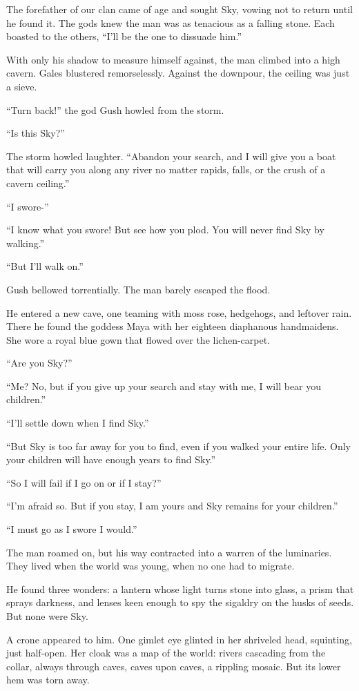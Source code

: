 The forefather of our clan came of age and sought Sky, vowing not to
return until he found it. The gods knew the man was as tenacious as a
falling stone. Each boasted to the others, ``I'll be the one to dissuade
him.''

With only his shadow to measure himself against, the man climbed into a
high cavern. Gales blustered remorselessly. Against the downpour, the
ceiling was just a sieve.

``Turn back!'' the god Gush howled from the storm.

``Is this Sky?''

The storm howled laughter. ``Abandon your search, and I will give you a
boat that will carry you along any river no matter rapids, falls, or the
crush of a cavern ceiling.''

``I swore-''

``I know what you swore! But see how you plod. You will never find Sky
by walking.''

``But I'll walk on.''

Gush bellowed torrentially. The man barely escaped the flood.

He entered a new cave, one teaming with moss rose, hedgehogs, and
leftover rain. There he found the goddess Maya with her eighteen
diaphanous handmaidens. She wore a royal blue gown that flowed over the
lichen-carpet.

``Are you Sky?''

``Me? No, but if you give up your search and stay with me, I will bear
you children.''

``I'll settle down when I find Sky.''

``But Sky is too far away for you to find, even if you walked your
entire life. Only your children will have enough years to find Sky.''

``So I will fail if I go on or if I stay?''

``I'm afraid so. But if you stay, I am yours and Sky remains for your
children.''

``I must go as I swore I would.''

The man roamed on, but his way contracted into a warren of the
luminaries. They lived when the world was young, when no one had to
migrate.

He found three wonders: a lantern whose light turns stone into glass, a
prism that sprays darkness, and lenses keen enough to spy the sigaldry
on the husks of seeds. But none were Sky.

A crone appeared to him. One gimlet eye glinted in her shriveled head,
squinting, just half-open. Her cloak was a map of the world: rivers
cascading from the collar, always through caves, caves upon caves, a
rippling mosaic. But its lower hem was torn away.

